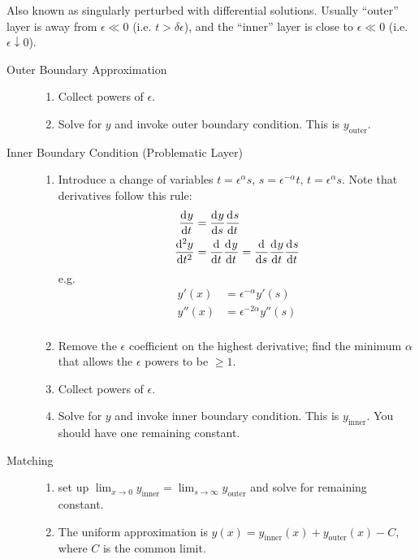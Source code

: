 \item[Boundary Layers] Also known as singularly perturbed with differential
  solutions. Usually ``outer'' layer is away from $\epsilon\ll0$ (i.e.
  $t>\delta\epsilon$), and the ``inner'' layer is close to $\epsilon\ll0$ (i.e.
  $\epsilon\downarrow0$).
  \begin{description}
  \item [Outer Boundary Approximation] \hfill
    \begin{enumerate}
    \item Collect powers of $\epsilon$.
    \item Solve for $y$ and invoke outer boundary condition. This is
      $y_{\text{outer}}$.
    \end{enumerate}
  \item[Inner Boundary Condition (Problematic Layer)] \hfill
    \begin{enumerate}
    \item Introduce a change of variables $t=\epsilon^{\alpha}s$,
      $s=\epsilon^{-\alpha}t$, $t=\epsilon^{\alpha}s$. Note that derivatives
      follow this rule:
      \begin{align*}
        \od{y}{t} &= \od{y}{s}\od{s}{t} \\
        \od[2]{y}{t} &= \od{}{t}\od{y}{t} = \od{}{s}\od{y}{t}\od{s}{t}
      \end{align*}
      e.g.
      \begin{align*}
        y'(x) &= \epsilon^{-\alpha}y'(s) \\
        y''(x) &= \epsilon^{-2\alpha}y''(s) \\
      \end{align*}
    \item Remove the $\epsilon$ coefficient on the highest derivative; find the
      minimum $\alpha$ that allows the $\epsilon$ powers to be $\ge1$.
    \item Collect powers of $\epsilon$.
    \item Solve for $y$ and invoke inner boundary condition. This is
      $y_{\text{inner}}$. You should have one remaining constant.
    \end{enumerate}
  \item[Matching] \hfill
    \begin{enumerate}
    \item set up
      $\lim_{x\rightarrow0}y_{\text{inner}}=\lim_{s\rightarrow\infty}y_{\text{outer}}$
      and solve for remaining constant.
    \item The uniform approximation is $y(x)=y_{\text{inner}}(x) +
      y_{\text{outer}}(x)-C$, where $C$ is the common limit.
    \end{enumerate}
  \end{description}

